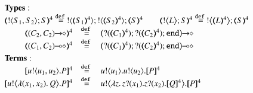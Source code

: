 \begin{figure}[t]
\small
\[
\begin{array}{rcl}
	\multicolumn{3}{l}{\bf Types:}
	\\
	\multicolumn{3}{c}{
		\tmap{\btout{S_1, S_2}S}{4} \defeq \btout{\tmap{S_1}{4}}  \btout{\tmap{S_2}{4}}\tmap{S}{4}
		\qquad
		\tmap{\bbtout{L} S}{4} \defeq \bbtout{\mapt{L}^{4}}\mapt{S}^{4}
	}
	\\
	\tmap{\shot{(C_2,  C_2)}}{4} &\defeq& \shot{\big(\btinp{\tmap{C_1}{4}} \btinp{\tmap{C_2}{4}}\tinact\big)}
	\\
	\tmap{\lhot{(C_1,  C_2)}}{4} &\defeq& \lhot{\big(\btinp{\tmap{C_1}{4}}  \btinp{\tmap{C_2}{4}}\tinact\big)}
	\\[1mm]
	\multicolumn{3}{l}{\noindent{\bf Terms:}}
	\\
	\map{\bout{u}{u_1, u_2} P}^{4} &\defeq& \bout{u}{u_1} \bout{u}{u_2} \map{P}^{4}
	\\
	\map{\bbout{u}{\abs{(x_1, x_2)} Q} P}^{4} &\defeq& \bbout{u}{\abs{z}\binp{z}{x_1} \binp{z}{x_2} \map{Q}^{4}} \map{P}^{4}
	\\


\end{array}\]
\end{figure}
